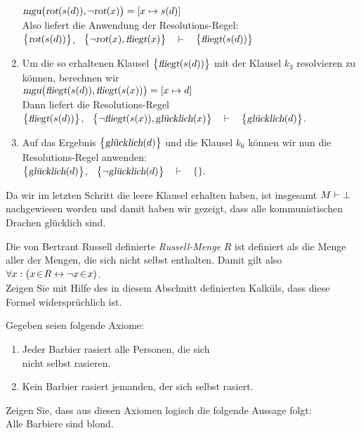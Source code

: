 \begin{enumerate}
      $\textsl{mgu}\bigl(\textsl{rot}(s(d)), \neg \textsl{rot}(x)\bigr) = [x \mapsto s(d)]$
      \\[0.2cm]
      Also liefert die Anwendung der Resolutions-Regel:
      \\[0.2cm]
      \hspace*{1.3cm}
      $\bigl\{\textsl{rot}(s(d))\bigl\}$, \ $\bigl\{\neg \textsl{rot}(x), \textsl{fliegt}(x)\bigl\}$ \ $\vdash$ \ $\bigl\{\textsl{fliegt}(s(d))\bigl\}$
\item Um die so erhaltenen Klausel $\bigl\{\textsl{fliegt}(s(d))\bigl\}$ mit der Klausel
      $k_3$ resolvieren zu k\"{o}nnen, berechnen wir
      \\[0.2cm]
      \hspace*{1.3cm}
      $\textsl{mgu}\bigl(\textsl{fliegt}(s(d)), \textsl{fliegt}(s(x))\bigr) = [x \mapsto d]$
      \\[0.2cm]
      Dann liefert die Resolutions-Regel
      \\[0.2cm]
      \hspace*{1.3cm}
      $\bigl\{\textsl{fliegt}(s(d))\bigl\}$, \ $\bigl\{\neg \textsl{fliegt}(s(x)), \textsl{gl\"{u}cklich}(x)\bigl\}$ \ $\vdash$ \ $\bigl\{\textsl{gl\"{u}cklich}(d)\bigl\}$.
\item Auf das Ergebnis $\bigl\{\textsl{gl\"{u}cklich}(d)\bigl\}$ und die Klausel $k_6$ k\"{o}nnen
      wir nun die Resolutions-Regel anwenden:
      \\[0.2cm]
      \hspace*{1.3cm}
      $\bigl\{\textsl{gl\"{u}cklich}(d)\bigl\}$, \  $\bigl\{\neg \textsl{gl\"{u}cklich}(d)\bigl\}$ \ $\vdash$ \ $\bigl\{\bigl\}$.
\end{enumerate}
Da wir im letzten Schritt die leere Klausel erhalten haben,  ist insgesamt $M \vdash
\bot$ 
nachgewiesen worden und damit haben wir gezeigt, dass alle kommunistischen Drachen gl\"{u}cklich sind. 
\eox

\exercise
Die von Bertrant Russell definierte \emph{Russell-Menge} $R$ ist
definiert als die Menge aller der Mengen, die sich nicht selbst enthalten.   Damit gilt also
\\[0.2cm]
\hspace*{1.3cm}
$\forall x: \bigl( x \!\in\! R \leftrightarrow \neg x \!\in\! x)$.
\\[0.2cm]
Zeigen Sie mit Hilfe des in diesem Abschnitt definierten Kalk\"{u}ls, dass diese Formel
widerspr\"{u}chlich ist. 
\vspace{0.3cm}

\exercise
Gegeben seien folgende Axiome:
\begin{enumerate}
\item Jeder Barbier rasiert alle Personen, die sich\\ nicht selbst rasieren.
\item Kein Barbier rasiert jemanden, der sich selbst rasiert.
\end{enumerate}
Zeigen Sie, dass aus diesen Axiomen logisch die folgende Aussage folgt: \\[0.3cm]
\hspace*{1.3cm} Alle Barbiere sind blond.

